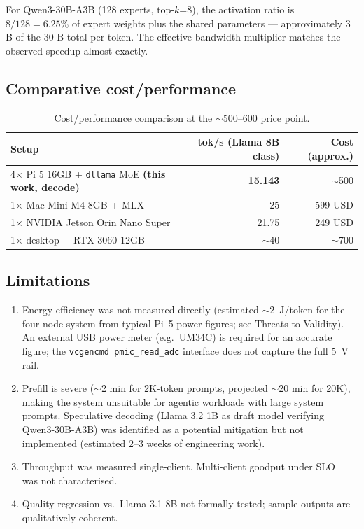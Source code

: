 \documentclass[10pt,a4paper]{article}
\providecommand{\euro}{}\renewcommand{\euro}{\texteuro}
\begin{document}
For Qwen3-30B-A3B (128 experts, top-$k$=8), the activation ratio is $8/128 = 6.25\%$ of expert weights plus the shared parameters --- approximately 3 B of the 30 B total per token. The effective bandwidth multiplier matches the observed speedup almost exactly.

\subsection{Comparative cost/performance}

\begin{table}[H]
\centering
\caption{Cost/performance comparison at the $\sim$500--600 \euro{} price point.}
\begin{tabular}{lrr}
\toprule
\textbf{Setup} & \textbf{tok/s (Llama 8B class)} & \textbf{Cost (approx.)} \\
\midrule
4$\times$ Pi 5 16GB + \texttt{dllama} MoE \textbf{(this work, decode)} & \textbf{15.143} & $\sim$500 \euro \\
1$\times$ Mac Mini M4 8GB + MLX & 25 & 599 USD \\
1$\times$ NVIDIA Jetson Orin Nano Super & 21.75 & 249 USD \\
1$\times$ desktop + RTX 3060 12GB & $\sim$40 & $\sim$700 \euro \\
\bottomrule
\end{tabular}
\end{table}

\subsection{Limitations}
\begin{enumerate}
  \item Energy efficiency was not measured directly (estimated $\sim$2~J/token for the four-node system from typical Pi~5 power figures; see Threats to Validity). An external USB power meter (e.g.\ UM34C) is required for an accurate figure; the \texttt{vcgencmd pmic\_read\_adc} interface does not capture the full 5~V rail.
  \item Prefill is severe ($\sim$2 min for 2K-token prompts, projected $\sim$20 min for 20K), making the system unsuitable for agentic workloads with large system prompts. Speculative decoding (Llama 3.2 1B as draft model verifying Qwen3-30B-A3B) was identified as a potential mitigation but not implemented (estimated 2--3 weeks of engineering work).
  \item Throughput was measured single-client. Multi-client goodput under SLO~\cite{zhong2024distserve} was not characterised.
  \item Quality regression vs.\ Llama 3.1 8B not formally tested; sample outputs are qualitatively coherent.
\end{enumerate}
\end{document}

